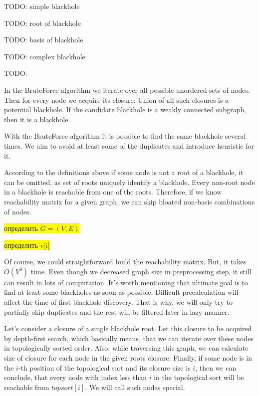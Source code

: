 \documentclass{svproc}
\newcommand{\FIXME}[1]{ %
	\colorbox{yellow}{#1}
}
\newcommand{\FIXME}[1]{ %
}
\begin{document}
\begin{definition}
TODO: simple blackhole
\end{definition}

\begin{definition}
TODO: root of blackhole
\end{definition}

\begin{definition}
TODO: basis of blackhole
\end{definition}

\begin{definition}
TODO: complex blackhole
\end{definition}

\begin{definition}
TODO:
\end{definition}

In the BruteForce algorithm we iterate over all possible unordered sets of nodes. 
Then for every node we acquire its closure. Union of all such closures is a potential blackhole.
If the candidate blackhole is a weakly connected subgraph, then it is a blackhole.

With the BruteForce algorithm it is possible to find the same blackhole several times.
We aim to avoid at least some of the duplicates and introduce heuristic for it.

According to the definitions above if some node is not a root of a blackhole, it can be omitted, as set of roots uniquely identify a blackhole.
Every non-root node in a blackhole is reachable from one of the roots. Therefore, if we know reachability matrix for a given graph, we can skip bloated non-basis combinations of nodes.

\FIXME{определить $G=(V, E)$}
\FIXME{определить v[i]}

Of course, we could straightforward build the reachability matrix. But, it takes $O(V^3)$ time. Even though we decreased graph size
in preprocessing step, it still can result in lots of computation. It's worth mentioning that ultimate goal is to find at least some blackholes as soon as possible. 
Difficult precalculation will affect the time of first blackhole discovery. That is why, we will only try to partially skip duplicates and the rest will
be filtered later in lazy manner.

Let's consider a closure of a single blackhole root. Let this closure to be acquired by depth-first search, which basically means, that
we can iterate over these nodes in topologically sorted order. Also, while traversing this graph, we can calculate size of closure for each node
in the given roots closure. Finally, if some node is in the $i$-th position of the topological sort and its closure size is $i$, then we can 
conclude, that every node with index less than $i$ in the topological sort will be reachable from $topsort[i]$. We will call such nodes special.
\end{document}
